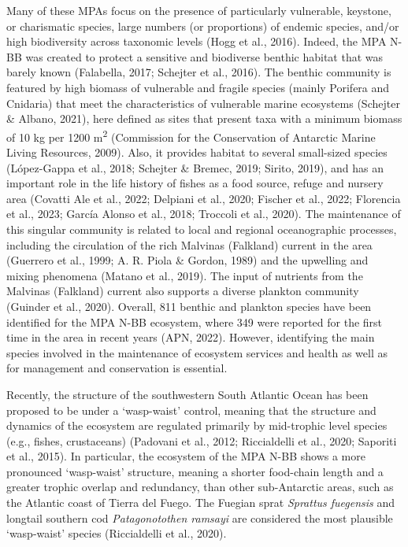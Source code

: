 \documentclass[preprint, 3p,
authoryear]{elsarticle} %
\begin{document}
Many of these MPAs focus on the presence of particularly vulnerable,
keystone, or charismatic species, large numbers (or proportions) of
endemic species, and/or high biodiversity across taxonomic levels (Hogg
et al., 2016). Indeed, the MPA N-BB was created to protect a sensitive
and biodiverse benthic habitat that was barely known (Falabella, 2017;
Schejter et al., 2016). The benthic community is featured by high
biomass of vulnerable and fragile species (mainly Porifera and Cnidaria)
that meet the characteristics of vulnerable marine ecosystems (Schejter
\& Albano, 2021), here defined as sites that present taxa with a minimum
biomass of 10 kg per 1200 m\textsuperscript{2} (Commission for the
Conservation of Antarctic Marine Living Resources, 2009). Also, it
provides habitat to several small-sized species (López-Gappa et al.,
2018; Schejter \& Bremec, 2019; Sirito, 2019), and has an important role
in the life history of fishes as a food source, refuge and nursery area
(Covatti Ale et al., 2022; Delpiani et al., 2020; Fischer et al., 2022;
Florencia et al., 2023; García Alonso et al., 2018; Troccoli et al.,
2020). The maintenance of this singular community is related to local
and regional oceanographic processes, including the circulation of the
rich Malvinas (Falkland) current in the area (Guerrero et al., 1999; A.
R. Piola \& Gordon, 1989) and the upwelling and mixing phenomena (Matano
et al., 2019). The input of nutrients from the Malvinas (Falkland)
current also supports a diverse plankton community (Guinder et al.,
2020). Overall, 811 benthic and plankton species have been identified
for the MPA N-BB ecosystem, where 349 were reported for the first time
in the area in recent years (APN, 2022). However, identifying the main
species involved in the maintenance of ecosystem services and health as
well as for management and conservation is essential.

Recently, the structure of the southwestern South Atlantic Ocean has
been proposed to be under a `wasp-waist' control, meaning that the
structure and dynamics of the ecosystem are regulated primarily by
mid-trophic level species (e.g., fishes, crustaceans) (Padovani et al.,
2012; Riccialdelli et al., 2020; Saporiti et al., 2015). In particular,
the ecosystem of the MPA N-BB shows a more pronounced `wasp-waist'
structure, meaning a shorter food-chain length and a greater trophic
overlap and redundancy, than other sub-Antarctic areas, such as the
Atlantic coast of Tierra del Fuego. The Fuegian sprat \emph{Sprattus
fuegensis} and longtail southern cod \emph{Patagonotothen ramsayi} are
considered the most plausible `wasp-waist' species (Riccialdelli et al.,
2020).
\end{document}
